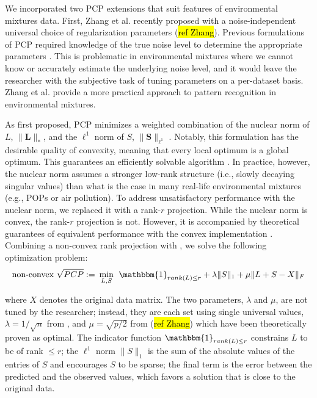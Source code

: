 We incorporated two PCP extensions that suit features of environmental mixtures data. First, Zhang et al. recently proposed \rootpcp with a noise-independent universal choice of regularization parameters (\hl{ref Zhang}). Previous formulations of PCP required knowledge of the true noise level to determine the appropriate parameters \citep{zhou2010stable, chen2015fast, chen2020bridging}. This is problematic in environmental mixtures where we cannot know or accurately estimate the underlying noise level, and it would leave the researcher with the subjective task of tuning parameters on a per-dataset basis. Zhang et al. provide a more practical approach to pattern recognition in environmental mixtures.

As first proposed, PCP minimizes a weighted combination of the nuclear norm of $L$, $\|\boldsymbol{L}\|_{*}$, and the $\ell^1$ norm of $S$, $\|\boldsymbol{S}\|_{\ell^1}$ \citep{zhou2010stable}. Notably, this formulation has the desirable quality of convexity, meaning that every local optimum is a global optimum. This guarantees an efficiently solvable algorithm \citep{boyd2004convex}. In practice, however, the nuclear norm assumes a stronger low-rank structure (i.e., slowly decaying singular values) than what is the case in many real-life environmental mixtures (e.g., POPs or air pollution). To address unsatisfactory performance with the nuclear norm, we replaced it with a rank-$r$ projection. While the nuclear norm is convex, the rank-$r$ projection is not. However, it is accompanied by theoretical guarantees of equivalent performance with the convex implementation \citep{netrapalli2014non, chen2020bridging}. Combining a non-convex rank projection with \rootpcpc, we solve the following optimization problem:
\begin{equation}\label{eqn:ncvxroot}
\text{non-convex }\sqrt{PCP} := \hspace{0.5ex} \min _{L, S} \hspace{1ex} \mathbbm{1}_{rank(L) \le r} + \lambda\|S\|_{1} + \mu\|L+S-X\|_{F}
\end{equation}

where $X$ denotes the original data matrix. The two parameters, $\lambda$ and $\mu$, are not tuned by the researcher; instead, they are each set using single universal values, $\lambda = 1/\sqrt{n}$ from \citet{candes2011robust}, and $\mu = \sqrt{p/2}$ from (\hl{ref Zhang}) which have been theoretically proven as optimal. The indicator function $\mathbbm{1}_{rank(L) \le r}$ constrains $L$ to be of rank $\le r$; the $\ell^1$ norm $\|S\|_{1}$ is the sum of the absolute values of the entries of $S$ and encourages $S$ to be sparse; the final term is the error between the predicted and the observed values, which favors a solution that is close to the original data.

